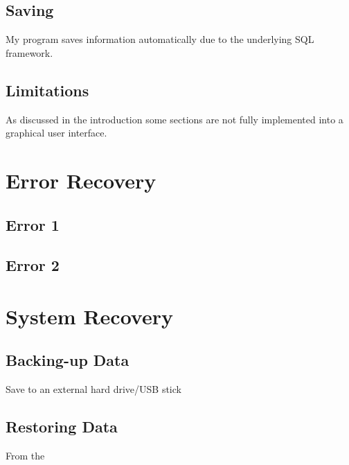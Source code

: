 \subsection{Saving}

My program saves information automatically due to the underlying SQL framework.

\subsection{Limitations}

As discussed in the introduction some sections are not fully implemented into a graphical user interface.

\section{Error Recovery}

\subsection{Error 1}

\subsection{Error 2}






\section{System Recovery}

\subsection{Backing-up Data}

Save to an external hard drive/USB stick

\subsection{Restoring Data}

From the